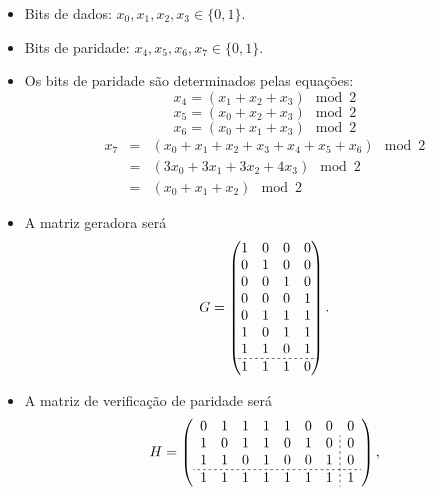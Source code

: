 \begin{frame}[allowframebreaks]
  \begin{itemize}
    \item Bits de dados: $x_0, x_1, x_2, x_3 \in \{0,1\}$.
    \item Bits de paridade: $x_4, x_5, x_6, x_7 \in \{0,1\}$.
    \item Os bits de paridade são determinados pelas equações:
        \begin{equation}
        x_4 = (x_1 + x_2 + x_3) \mod 2
        \end{equation}
        \begin{equation}
        x_5 = (x_0 + x_2 + x_3) \mod 2
        \end{equation}
        \begin{equation}
        x_6 = (x_0 + x_1 + x_3) \mod 2
        \end{equation}
	\begin{eqnarray}
	x_7 &=& (x_0 + x_1 + x_2 + x_3 + x_4 + x_5 + x_6) \mod 2 \\
	    &=& (3 x_0 + 3 x_1 + 3 x_2 + 4 x_3 ) \mod 2 \\
	    &=& (x_0 + x_1 + x_2) \mod 2
	\end{eqnarray}	
    \item A matriz geradora será
        \begin{equation}
        G = 
        \begin{pmatrix}
        1 & 0 & 0 & 0 \\
        0 & 1 & 0 & 0 \\
        0 & 0 & 1 & 0 \\
        0 & 0 & 0 & 1 \\
        0 & 1 & 1 & 1 \\
        1 & 0 & 1 & 1 \\
        1 & 1 & 0 & 1 \\ \hdashline[2pt/2pt]
	1 & 1 & 1 & 0
        \end{pmatrix}.
        \end{equation}

    \item A matriz de verificação de paridade será
        \begin{equation}\label{eq-Hmat844}
        H = 
        \left(
        \begin{array}{ccccccc;{2pt/2pt}c}
        0 & 1 & 1 & 1 & 1 & 0 & 0 & 0 \\
        1 & 0 & 1 & 1 & 0 & 1 & 0 & 0 \\
        1 & 1 & 0 & 1 & 0 & 0 & 1 & 0 \\ \hdashline[2pt/2pt]
        1 & 1 & 1 & 1 & 1 & 1 & 1 & 1
        \end{array}
        \right),
        \end{equation} 


\end{itemize}
\end{frame}
